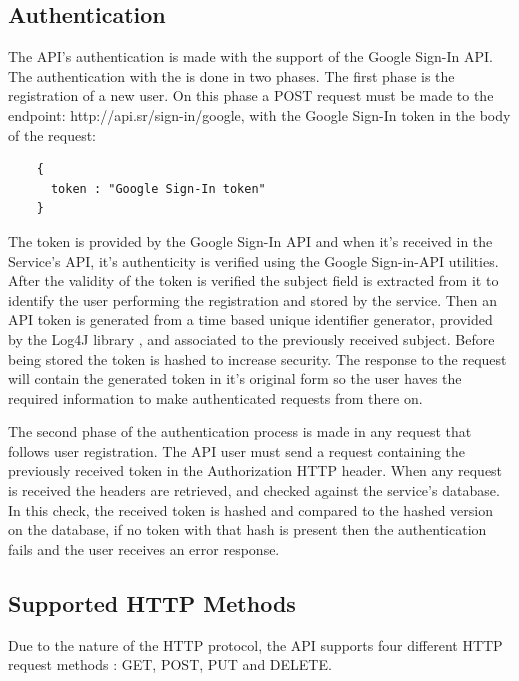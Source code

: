         \newpage
    
    \subsection*{Authentication}
    The API's authentication is made with the support of the Google Sign-In API. 
    The authentication with the is done in two phases. The first phase is the registration of a new user. 
    On this phase a POST \cite{httppostdocs} request must be made to the endpoint: http://api.sr/sign-in/google, 
    with the Google Sign-In token in the body of the request:
    \begin{lstlisting}
    {
      token : "Google Sign-In token"
    }
     \end{lstlisting}
    The token is provided by the Google Sign-In API and when it's received in the Service's API, 
    it's authenticity is verified using the Google Sign-in-API utilities. After the validity of the token is verified 
    the subject field is extracted from it to identify the user performing the registration and stored by the service. 
    Then an API token is generated from a time based unique identifier generator, provided by the Log4J library \cite{log4j},
    and associated to the previously received subject. Before being stored the token is hashed to increase security. 
    The response to the request will contain the generated token in it's original form so the user haves the required information 
    to make authenticated requests from there on.\par

    The second phase of the authentication process is made in any request that follows user registration. The API user must 
    send a request containing the previously received token in the Authorization HTTP header. When any request is received 
    the headers are retrieved, and checked against the service's database. In this check, the received token is hashed and 
    compared to the hashed version on the database, if no token with that hash is present then the authentication fails 
    and the user receives an error response.

    \newpage
    \subsection*{Supported HTTP Methods}
        Due to the nature of the HTTP protocol, the API supports four different HTTP request methods \cite{apihttpverbsdocs}: GET, POST, PUT and DELETE.
        
